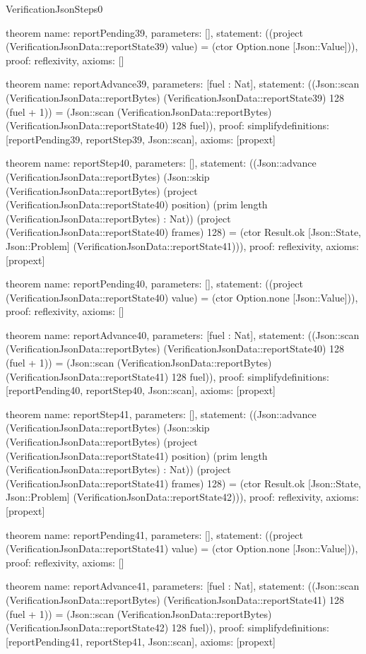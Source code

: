 \begin{lexlean}{VerificationJsonSteps0}
\begin{semanticmodule}
theorem{
  name: reportPending39,
  parameters: [],
  statement: ((project (VerificationJsonData::reportState39) value) = (ctor Option.none [Json::Value])),
  proof: reflexivity{},
  axioms: []
}

theorem{
  name: reportAdvance39,
  parameters: [fuel : Nat],
  statement: ((Json::scan (VerificationJsonData::reportBytes) (VerificationJsonData::reportState39) 128 (fuel + 1)) = (Json::scan (VerificationJsonData::reportBytes) (VerificationJsonData::reportState40) 128 fuel)),
  proof: simplify{definitions: [reportPending39, reportStep39, Json::scan]},
  axioms: [propext]
}

theorem{
  name: reportStep40,
  parameters: [],
  statement: ((Json::advance (VerificationJsonData::reportBytes) (Json::skip (VerificationJsonData::reportBytes) (project (VerificationJsonData::reportState40) position) (prim length (VerificationJsonData::reportBytes) : Nat)) (project (VerificationJsonData::reportState40) frames) 128) = (ctor Result.ok [Json::State, Json::Problem] (VerificationJsonData::reportState41))),
  proof: reflexivity{},
  axioms: [propext]
}

theorem{
  name: reportPending40,
  parameters: [],
  statement: ((project (VerificationJsonData::reportState40) value) = (ctor Option.none [Json::Value])),
  proof: reflexivity{},
  axioms: []
}

theorem{
  name: reportAdvance40,
  parameters: [fuel : Nat],
  statement: ((Json::scan (VerificationJsonData::reportBytes) (VerificationJsonData::reportState40) 128 (fuel + 1)) = (Json::scan (VerificationJsonData::reportBytes) (VerificationJsonData::reportState41) 128 fuel)),
  proof: simplify{definitions: [reportPending40, reportStep40, Json::scan]},
  axioms: [propext]
}

theorem{
  name: reportStep41,
  parameters: [],
  statement: ((Json::advance (VerificationJsonData::reportBytes) (Json::skip (VerificationJsonData::reportBytes) (project (VerificationJsonData::reportState41) position) (prim length (VerificationJsonData::reportBytes) : Nat)) (project (VerificationJsonData::reportState41) frames) 128) = (ctor Result.ok [Json::State, Json::Problem] (VerificationJsonData::reportState42))),
  proof: reflexivity{},
  axioms: [propext]
}

theorem{
  name: reportPending41,
  parameters: [],
  statement: ((project (VerificationJsonData::reportState41) value) = (ctor Option.none [Json::Value])),
  proof: reflexivity{},
  axioms: []
}

theorem{
  name: reportAdvance41,
  parameters: [fuel : Nat],
  statement: ((Json::scan (VerificationJsonData::reportBytes) (VerificationJsonData::reportState41) 128 (fuel + 1)) = (Json::scan (VerificationJsonData::reportBytes) (VerificationJsonData::reportState42) 128 fuel)),
  proof: simplify{definitions: [reportPending41, reportStep41, Json::scan]},
  axioms: [propext]
}


\end{semanticmodule}
\end{lexlean}
